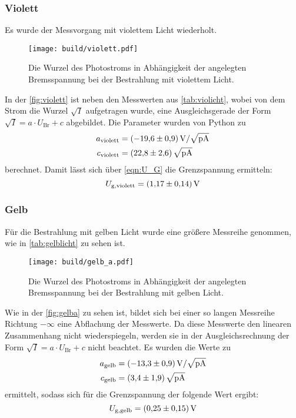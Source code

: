 \subsubsection{Violett}
Es wurde der Messvorgang mit violettem Licht wiederholt.
\begin{figure}[H]
  \texttt{[image: build/violett.pdf]}
  \caption{Die Wurzel des Photostroms in Abhängigkeit der angelegten Bremsspannung bei der Bestrahlung mit violettem Licht.}
  \label{fig:violett}
\end{figure}
\noindent
In der \autoref{fig:violett} ist neben den Messwerten aus \autoref{tab:violicht}, wobei von dem Strom die Wurzel $\sqrt{I}$ aufgetragen wurde, 
eine Ausgleichsgerade der Form $\sqrt{I} = a \cdot U_{\text{Br}} + c $ abgebildet.
Die Parameter wurden von Python zu
\begin{align*}
  a_{\text{violett}} &= \SI{-19.6\pm 0.9}{\volt\per\sqrt{\pico\ampere}}\\
  c_{\text{violett}} &= \SI{22.8 \pm 2.6}{\sqrt{\pico\ampere}}
\end{align*}
berechnet.
Damit lässt sich über \eqref{eqn:U_G} die Grenzspannung ermitteln:
\begin{equation*}
  U_{\text{g},\text{violett}} = \SI{1.17 \pm 0.14}{\volt}
\end{equation*}

\subsubsection{Gelb}
Für die Bestrahlung mit gelben Licht wurde eine größere Messreihe genommen, wie in \autoref{tab:gelblicht} zu sehen ist.
\begin{figure}[H]
  \texttt{[image: build/gelb\_a.pdf]}
  \caption{Die Wurzel des Photostroms in Abhängigkeit der angelegten Bremsspannung bei der Bestrahlung mit gelben Licht.}
  \label{fig:gelba}
\end{figure}
\noindent
Wie in der \autoref{fig:gelba} zu sehen ist, bildet sich bei einer so langen Messreihe Richtung $-\infty$ eine Abflachung der Messwerte.
Da diese Messwerte den linearen Zusammenhang nicht wiederspiegeln, werden sie in der Ausgleichsrechnung der Form $\sqrt{I} = a \cdot U_{\text{Br}} + c $ nicht beachtet.
Es wurden die Werte zu 
\begin{align*}
  a_{\text{gelb}} &= \SI{-13.3 \pm 0.9}{\volt\per\sqrt{\pico\ampere}}\\
  c_{\text{gelb}} &= \SI{3.4 \pm 1.9}{\sqrt{\pico\ampere}}
\end{align*}
ermittelt, sodass sich für die Grenzspannung der folgende Wert ergibt:
\begin{equation*}
  U_{\text{g},\text{gelb}} = \SI{0.25 \pm 0.15}{\volt}
\end{equation*}

